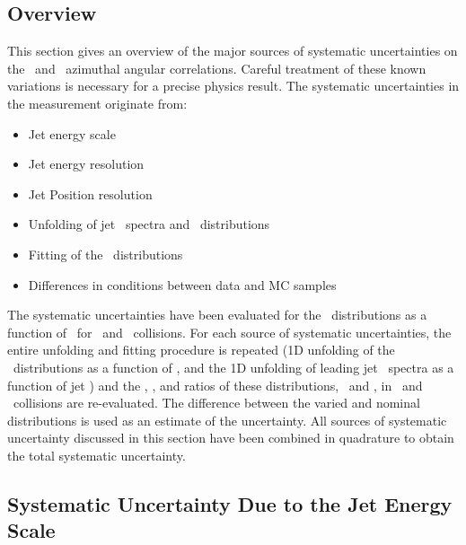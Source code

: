 
\subsection{Overview}
This section gives an overview of the major sources of systematic uncertainties on the \pp\ and \pPb\ azimuthal angular correlations. Careful treatment of these known variations is necessary for a precise physics result. The systematic uncertainties in the measurement originate from:

\begin{itemize}

\item Jet energy scale

\item Jet energy resolution

\item Jet Position resolution

\item Unfolding of jet \pt\ spectra and \conetwo\ distributions

\item Fitting of the \conetwo\ distributions

\item Differences in conditions between data and MC samples

\end{itemize}

The systematic uncertainties have been evaluated for the \conetwo\ distributions as a function of \ystar\ for \pp\ and \pPb\ collisions. For each source of systematic uncertainties, the entire unfolding and fitting procedure is repeated (1D unfolding of the \conetwo\ distributions as a function of \Dphi, and the 1D unfolding of leading jet \pt\ spectra as a function of jet \pt) and the \wonetwo, \ionetwo, and ratios of these distributions, \cppb\ and \ippb, in \pPb\ and \pp\ collisions are re-evaluated. The difference between the varied and nominal distributions is used as an estimate of the uncertainty. All sources of systematic uncertainty discussed in this section have been combined in quadrature to obtain the total systematic uncertainty. 

\subsection{Systematic Uncertainty Due to the Jet Energy Scale}

